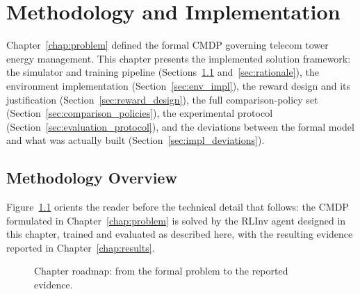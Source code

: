 \chapter{Methodology and Implementation}
\label{chap:methodology}

Chapter~\ref{chap:problem} defined the formal CMDP governing telecom tower
energy management. This chapter presents the implemented solution
framework: the simulator and training pipeline (Sections~\ref{sec:overview}
and~\ref{sec:rationale}), the environment implementation
(Section~\ref{sec:env_impl}), the reward design and its justification
(Section~\ref{sec:reward_design}), the full comparison-policy set
(Section~\ref{sec:comparison_policies}), the experimental protocol
(Section~\ref{sec:evaluation_protocol}), and the deviations between the
formal model and what was actually built
(Section~\ref{sec:impl_deviations}).

\section{Methodology Overview}
\label{sec:overview}

Figure~\ref{fig:chapter_roadmap} orients the reader before the technical
detail that follows: the CMDP formulated in Chapter~\ref{chap:problem} is
solved by the RLInv agent designed in this chapter, trained and
evaluated as described here, with the resulting evidence reported in
Chapter~\ref{chap:results}.

\begin{figure}[htbp]
\centering
{}
\caption{Chapter roadmap: from the formal problem to the reported
evidence.}
\label{fig:chapter_roadmap}
\end{figure}

